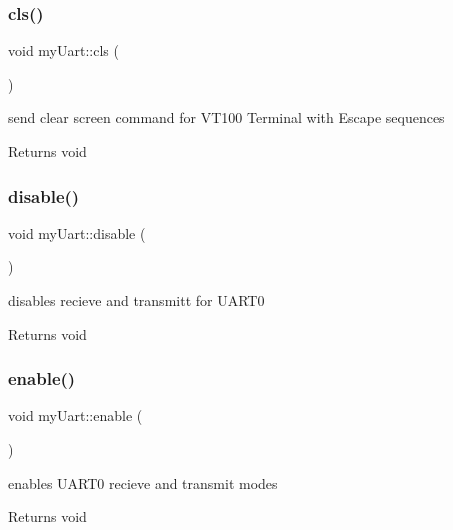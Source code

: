\subsubsection{\texorpdfstring{cls()}{cls()}}
{\footnotesize\ttfamily void my\+Uart\+::cls (\begin{DoxyParamCaption}{ }\end{DoxyParamCaption})}



send clear screen command for V\+T100 Terminal with Escape sequences 

\begin{DoxyReturn}{Returns}
void 
\end{DoxyReturn}
\mbox{\label{classmy_uart_a45e1a479b7775961d452e4000f599769}} 
\subsubsection{\texorpdfstring{disable()}{disable()}}
{\footnotesize\ttfamily void my\+Uart\+::disable (\begin{DoxyParamCaption}{ }\end{DoxyParamCaption})}



disables recieve and transmitt for U\+A\+R\+T0 

\begin{DoxyReturn}{Returns}
void 
\end{DoxyReturn}
\mbox{\label{classmy_uart_ab6a6bcf4fe99fb9e4dc5e69f57600488}} 
\subsubsection{\texorpdfstring{enable()}{enable()}}
{\footnotesize\ttfamily void my\+Uart\+::enable (\begin{DoxyParamCaption}{ }\end{DoxyParamCaption})}



enables U\+A\+R\+T0 recieve and transmit modes 

\begin{DoxyReturn}{Returns}
void 
\end{DoxyReturn}
\mbox{\label{classmy_uart_a08971c41f424a701504cec9e2751aa49}} 
